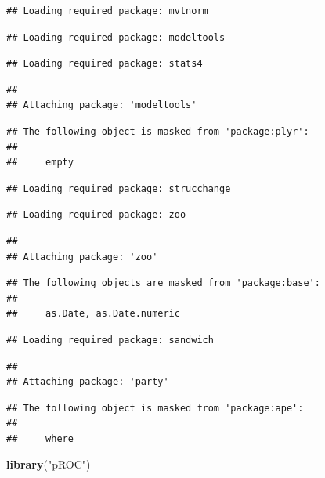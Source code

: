 \documentclass[]{article}
\newenvironment{Shaded}{\begin{snugshade}}{\end{snugshade}}
\newcommand{\KeywordTok}[1]{\textcolor[rgb]{0.13,0.29,0.53}{\textbf{#1}}}
\newcommand{\NormalTok}[1]{#1}
\newcommand{\StringTok}[1]{\textcolor[rgb]{0.31,0.60,0.02}{#1}}
\begin{document}
\begin{verbatim}
## Loading required package: mvtnorm
\end{verbatim}

\begin{verbatim}
## Loading required package: modeltools
\end{verbatim}

\begin{verbatim}
## Loading required package: stats4
\end{verbatim}

\begin{verbatim}
## 
## Attaching package: 'modeltools'
\end{verbatim}

\begin{verbatim}
## The following object is masked from 'package:plyr':
## 
##     empty
\end{verbatim}

\begin{verbatim}
## Loading required package: strucchange
\end{verbatim}

\begin{verbatim}
## Loading required package: zoo
\end{verbatim}

\begin{verbatim}
## 
## Attaching package: 'zoo'
\end{verbatim}

\begin{verbatim}
## The following objects are masked from 'package:base':
## 
##     as.Date, as.Date.numeric
\end{verbatim}

\begin{verbatim}
## Loading required package: sandwich
\end{verbatim}

\begin{verbatim}
## 
## Attaching package: 'party'
\end{verbatim}

\begin{verbatim}
## The following object is masked from 'package:ape':
## 
##     where
\end{verbatim}

\begin{Shaded}
\begin{Highlighting}[]
\KeywordTok{library}\NormalTok{(}\StringTok{"pROC"}\NormalTok{)}
\end{Highlighting}
\end{Shaded}
\end{document}
